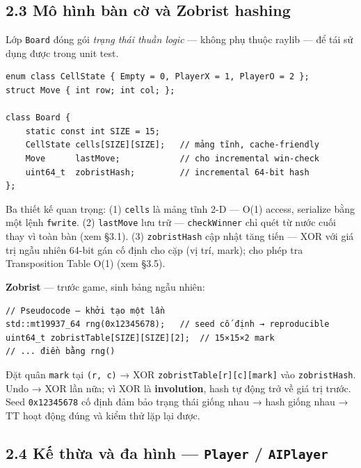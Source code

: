 \documentclass[11pt,a4paper]{article}
\begin{document}
\subsection{2.3 Mô hình bàn cờ và Zobrist hashing}
\label{sec:org505b7b1}

Lớp \texttt{Board} đóng gói \emph{trạng thái thuần logic} — không phụ thuộc raylib — để tái sử dụng được trong unit test.

\begin{verbatim}
enum class CellState { Empty = 0, PlayerX = 1, PlayerO = 2 };
struct Move { int row; int col; };

class Board {
    static const int SIZE = 15;
    CellState cells[SIZE][SIZE];   // mảng tĩnh, cache-friendly
    Move      lastMove;            // cho incremental win-check
    uint64_t  zobristHash;         // incremental 64-bit hash
};
\end{verbatim}

Ba thiết kế quan trọng: (1) \texttt{cells} là mảng tĩnh 2-D — O(1) access, serialize bằng một lệnh \texttt{fwrite}. (2) \texttt{lastMove} lưu trữ — \texttt{checkWinner} chỉ quét từ nước cuối thay vì toàn bàn (xem §3.1). (3) \texttt{zobristHash} cập nhật tăng tiến — XOR với giá trị ngẫu nhiên 64-bit gán cố định cho cặp (vị trí, mark); cho phép tra Transposition Table O(1) (xem §3.5).

\textbf{Zobrist} — trước game, sinh bảng ngẫu nhiên:

\begin{verbatim}
// Pseudocode — khởi tạo một lần
std::mt19937_64 rng(0x12345678);   // seed cố định → reproducible
uint64_t zobristTable[SIZE][SIZE][2];  // 15×15×2 mark
// ... điền bằng rng()
\end{verbatim}

Đặt quân \texttt{mark} tại \texttt{(r, c)} → XOR \texttt{zobristTable[r][c][mark]} vào \texttt{zobristHash}. Undo → XOR lần nữa; vì XOR là \textbf{involution}, hash tự động trở về giá trị trước. Seed \texttt{0x12345678} cố định đảm bảo trạng thái giống nhau → hash giống nhau → TT hoạt động đúng và kiểm thử lặp lại được.
\subsection{2.4 Kế thừa và đa hình — \texttt{Player} / \texttt{AIPlayer}}
\label{sec:org6fc0613}
\end{document}
